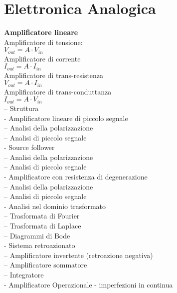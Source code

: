\documentclass{article}
\begin{document}
\newpage
\section*{Elettronica Analogica}
\textbf{Amplificatore lineare}\\
\hspace*{1cm} Amplificatore di tensione:\\
\hspace*{2cm} $V_{out} = A \cdot V_{in}$\\
\hspace*{1cm} Amplificatore di corrente\\
\hspace*{2cm} $I_{out} = A \cdot I_{in}$\\
\hspace*{1cm} Amplificatore di trans-resistenza\\
\hspace*{2cm} $V_{out} = A \cdot I_{in}$\\
\hspace*{1cm} Amplificatore di trans-conduttanza\\
\hspace*{2cm} $I_{out} = A \cdot V_{in}$\\
-- Struttura\\
- Amplificatore lineare di piccolo segnale\\
-- Analisi della polarizzazione\\
-- Analisi di piccolo segnale\\
- Source follower\\
-- Analisi della polarizzazione\\
-- Analisi di piccolo segnale\\
- Amplificatore con resistenza di degenerazione\\
-- Analisi della polarizzazione\\
-- Analisi di piccolo segnale\\
- Analisi nel dominio trasformato\\
-- Trasformata di Fourier\\
-- Trasformata di Laplace\\
-- Diagrammi di Bode\\
- Sistema retroazionato\\
-- Amplificatore invertente (retroazione negativa)\\
-- Amplificatore sommatore\\
-- Integratore\\
- Amplificatore Operazionale - imperfezioni in continua\\
\end{document}
